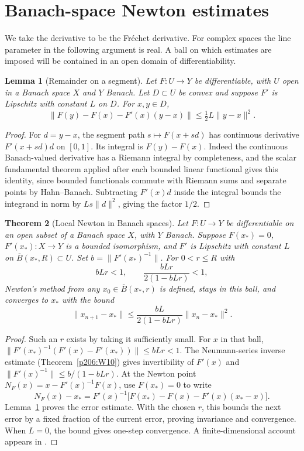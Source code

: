 \documentclass[11pt,oneside,openany]{book}
\theoremstyle{plain}
\newtheorem{theorem}{Theorem}[chapter]
\newtheorem{lemma}[theorem]{Lemma}
\theoremstyle{definition}
\theoremstyle{remark}
\begin{document}
\section{Banach-space Newton estimates}

We take the derivative to be the Fr\'echet derivative. For complex
spaces the line parameter in the following argument is real. A ball
on which estimates are imposed will be contained in an open domain
of differentiability.

\begin{lemma}[Remainder on a segment]\label{p206:newton-segment}
Let \(F\colon U\to Y\) be differentiable, with \(U\) open in a
Banach space \(X\) and \(Y\) Banach. Let \(D\subset U\) be convex and
suppose \(F'\) is Lipschitz with constant \(L\) on \(D\).
For \(x,y\in D\),
\[
 \|F(y)-F(x)-F'(x)(y-x)\|\le\tfrac12 L\|y-x\|^2 .
\]
\end{lemma}
\begin{proof}
For \(d=y-x\), the segment path \(s\mapsto F(x+sd)\) has continuous
derivative \(F'(x+sd)d\) on \([0,1]\). Its integral is
\(F(y)-F(x)\). Indeed the continuous Banach-valued derivative has a
Riemann integral by completeness, and the scalar fundamental theorem
applied after each bounded linear functional gives this identity,
since bounded functionals commute with Riemann sums and separate
points by Hahn--Banach. Subtracting \(F'(x)d\) inside the integral
bounds the integrand in norm by \(Ls\|d\|^2\), giving the
factor \(1/2\).
\end{proof}

\begin{theorem}[Local Newton in Banach spaces]\label{p206:W76}
Let \(F\colon U\to Y\) be differentiable on an open subset of
a Banach space \(X\), with \(Y\) Banach. Suppose \(F(x_*)=0\),
\(F'(x_*)\colon X\to Y\) is a bounded isomorphism, and \(F'\) is
Lipschitz with constant \(L\) on \(\overline B(x_*,R)\subset U\).
Set \(b=\|F'(x_*)^{-1}\|\). For \(0<r\le R\) with
\[
 bLr<1,\qquad \frac{bLr}{2(1-bLr)}<1 ,
\]
Newton's method from any \(x_0\in\overline B(x_*,r)\) is defined,
stays in this ball, and converges to \(x_*\) with the bound
\[
 \|x_{n+1}-x_*\|\le \frac{bL}{2(1-bLr)}\|x_n-x_*\|^2.
\]
\end{theorem}
\begin{proof}
Such an \(r\) exists by taking it sufficiently small.
For \(x\) in that ball,
\(\|F'(x_*)^{-1}(F'(x)-F'(x_*))\|\le bLr<1\).
The Neumann-series inverse estimate (Theorem~\ref{p206:W10})
gives invertibility of \(F'(x)\) and
\(\|F'(x)^{-1}\|\le b/(1-bLr)\). At the Newton point
\(N_F(x)=x-F'(x)^{-1}F(x)\), use \(F(x_*)=0\) to write
\[
 N_F(x)-x_*
  =F'(x)^{-1}\bigl[F(x_*)-F(x)-F'(x)(x_*-x)\bigr].
\]
Lemma~\ref{p206:newton-segment} proves the error estimate. With the
chosen \(r\), this bounds the next error by a fixed fraction of the
current error, proving invariance and convergence. When \(L=0\),
the bound gives one-step convergence. A finite-dimensional account
appears in \cite[Section~5.3]{stoer}.
\end{proof}
\end{document}
